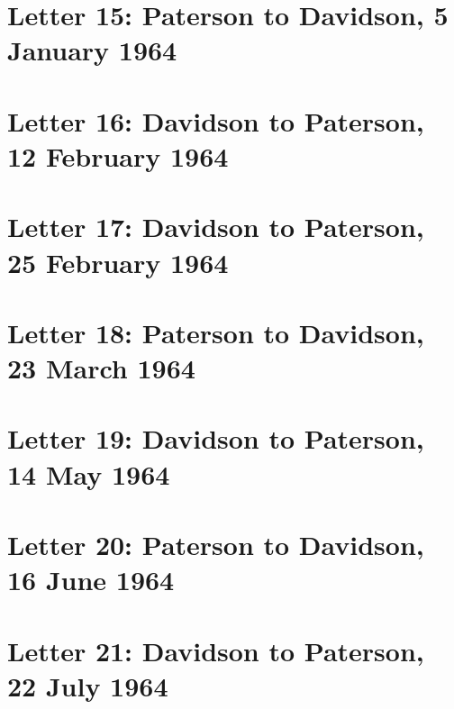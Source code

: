 \documentclass[a4paper,11pt,abstracton,hidelinks]{scrartcl}
\begin{document}
\section{Letter 15: Paterson to Davidson, 5 January 1964}


\section{Letter 16: Davidson to Paterson, 12 February 1964}


\section{Letter 17: Davidson to Paterson, 25 February 1964}


\section{Letter 18: Paterson to Davidson, 23 March 1964}


\section{Letter 19: Davidson to Paterson, 14 May 1964}


\section{Letter 20: Paterson to Davidson, 16 June 1964}


\section{Letter 21: Davidson to Paterson, 22 July 1964}

\end{document}
